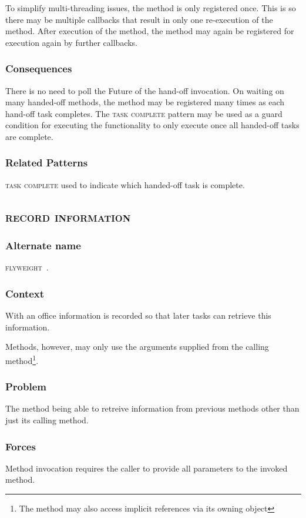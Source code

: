 \documentclass[prodmode]{style/acmlarge}
\begin{document}
To simplify multi-threading issues, the method is only registered once.  This is
so there may be multiple callbacks that result in only one re-execution of the
method. After execution of the method, the method may again be registered for
execution again by further callbacks.

\subsubsection*{Consequences} There is no need to poll the Future of the
hand-off invocation.  On waiting on many handed-off methods, the method may be
registered many times as each hand-off task completes.  The \textsc{task
complete} pattern may be used as a guard condition for executing the
functionality to only execute once all handed-off tasks are complete.

\subsubsection*{Related Patterns} \textsc{task complete} used to indicate which
handed-off task is complete.



\subsection{\textsc{\textbf{record information}}}

\subsubsection*{Alternate name} \textsc{flyweight}~\cite{gof}.

\subsubsection*{Context} With an office information is recorded so that later
tasks can retrieve this information.

Methods, however, may only use the arguments supplied from the calling
method\footnote{The method may also access implicit references via its
owning object}.

\subsubsection*{Problem} The method being able to retreive information from
previous methods other than just its calling method.

\subsubsection*{Forces} Method invocation requires the caller to provide all
parameters to the invoked method.
\end{document}
